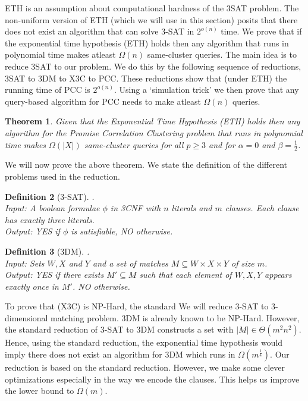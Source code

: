 \documentclass[12pt]{article}
\newtheorem{theorem}{Theorem}
\newtheorem{definition}[theorem]{Definition}
\begin{document}
ETH is an assumption about computational hardness of the 3SAT problem. The non-uniform version of ETH (which we will use in this section) posits that there does not exist an algorithm that can solve 3-SAT in $2^{o(n)}$ time. We prove that if the exponential time hypothesis (ETH) holds then any algorithm that runs in polynomial time makes atleast $\Omega(n)$ same-cluster queries. The main idea is to reduce 3SAT to our problem. We do this by the following sequence of reductions, 3SAT to 3DM to X3C to PCC. These reductions show that (under ETH) the running time of PCC is $2^{o(n)}$. Using a `simulation trick' we then prove that any query-based algorithm for PCC needs to make atleast $\Omega(n)$ queries.

\begin{theorem}
Given that the Exponential Time Hypothesis (ETH) holds then any algorithm for the Promise Correlation Clustering problem  that runs in polynomial time makes $\Omega(|X|)$ same-cluster queries for all $p \ge 3$ and for $\alpha = 0$ and $\beta = \frac{1}{2}$. 
\end{theorem}

\noindent We will now prove the above theorem. We state the definition of the different problems used in the reduction.
\begin{definition}[3-SAT].\\
Input: A boolean formulae $\phi$ in 3CNF with $n$ literals and $m$ clauses. Each clause has exactly three literals. \\
Output: YES if $\phi$ is satisfiable, NO otherwise. 
\end{definition}

\begin{definition}[3DM].\\
Input: Sets $W, X$ and $Y$ and a set of matches $M \subseteq W \times X \times Y$ of size $m$.  \\
Output: YES if there exists $M' \subseteq M$ such that each element of $W, X, Y$ appears exactly once in $M'$. NO otherwise. 
\end{definition}

\noindent To prove that (X3C) is NP-Hard, the standard We will reduce 3-SAT to 3-dimensional matching problem. 3DM is already known to be NP-Hard. However, the standard reduction of 3-SAT to 3DM constructs a set with $|M| \in \Theta(m^2 n^2)$. Hence, using the standard reduction, the exponential time hypothesis would imply there does not exist an algorithm for 3DM which runs in $\Omega(m^\frac{1}{4})$. Our reduction is based on the standard reduction. However, we make some clever optimizations especially in the way we encode the clauses. This helps us improve the lower bound to $\Omega(m)$.
\end{document}
